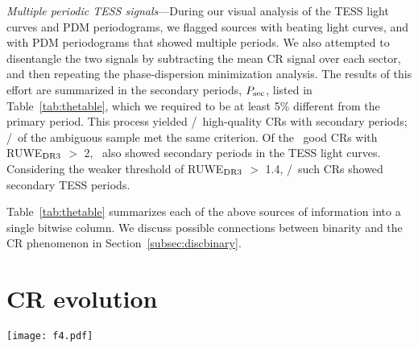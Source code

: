 \documentclass[11pt,twocolumn,tighten]{aastex63}
\begin{document}
{\it Multiple periodic TESS signals}---During our visual analysis of
the TESS light curves and PDM periodograms, we flagged sources with
beating light curves, and with PDM periodograms that showed multiple
periods.  We also attempted to disentangle the two signals by
subtracting the mean CR signal over each sector, and then repeating
the phase-dispersion minimization analysis.  The results of this effort
are summarized in the secondary periods, $P_{\rm sec}$, listed in
Table~\ref{tab:thetable}, which we required to be at least 5\%
different from the primary period.  This process yielded
\ngoodmultperiodflag/\ngoods\ high-quality CRs with secondary
periods; \nmaybemultperiodflag/\nmaybes\ of the ambiguous sample met
the same criterion.  Of the \ngoodhighruwe\ good CRs with RUWE$_{\rm
DR3}$ $>$ 2, \ngoodruweandmultperiod\ also showed secondary periods in
the TESS light curves.  Considering the weaker threshold of RUWE$_{\rm
DR3}$ $>$ 1.4, \ngoodweakruweandmultperiod/\ngoodweakruwe\ such CRs
showed secondary TESS periods.

Table~\ref{tab:thetable} summarizes each of the above sources of
information into a single bitwise column.  We discuss possible
connections between binarity and the CR phenomenon in
Section~\ref{subsec:discbinary}.


\section{CR evolution}
\label{sec:evoln}

\begin{figure*}[!tp]
	\begin{center}
		\centering
		\texttt{[image: f4.pdf]}
		\vspace{-0.6cm}
		\caption{
			{\bf CRs keep their periods but change their shapes.}
			Out of the \ngoods\ CRs in Figure~\ref{fig:cqvs}, 32 had
			120-second cadence TESS data available for a baseline of at
			least two years; the 27 brightest are shown here due to space
			constraints.  Each panel shows one sector of TESS data, and is
			phased to its deepest minimum in flux.  Each panel's title shows
			the TIC identifier and approximate period in hours.  Text insets
			show the TESS sector numbers, which generally span two years, or
			at least 1{,}000 cycles.  The vertical scale is fixed across
			sectors to clarify shape changes.  Gray circles are raw 2-minute
			data; colored circles bin to 300 points per cycle. 
		}
		\label{fig:evoln}
	\end{center}
\end{figure*}
\end{document}
